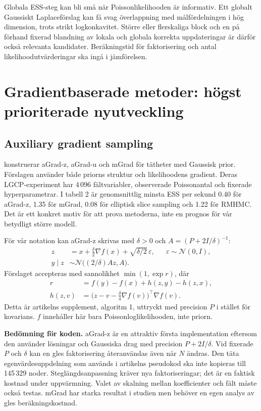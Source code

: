 \documentclass[11pt,a4paper]{article}
\newcommand{\N}{\mathcal N}
\begin{document}
Globala ESS-steg kan bli små när Poissonlikelihooden är informativ. Ett globalt Gaussiskt Laplaceförslag kan få svag överlappning med målfördelningen i hög dimension, trots strikt logkonkavitet. Större eller flerskaliga block och en på förhand fixerad blandning av lokala och globala korrekta uppdateringar är därför också relevanta kandidater. Beräkningstid för faktorisering och antal likelihoodutvärderingar ska ingå i jämförelsen.

\section{Gradientbaserade metoder: högst prioriterade nyutveckling}

\subsection{Auxiliary gradient sampling}

\citet{titsias2018auxiliary} konstruerar aGrad-z, aGrad-u och mGrad för tätheter med Gaussisk prior. Förslagen använder både priorns struktur och likelihoodens gradient. Deras LGCP-experiment har 4\,096 fältvariabler, observerade Poissonantal och fixerade hyperparametrar. I tabell 2 är genomsnittlig minsta ESS per sekund 0.40 för aGrad-z, 1.35 för mGrad, 0.08 för elliptisk slice sampling och 1.22 för RMHMC. Det är ett konkret motiv för att prova metoderna, inte en prognos för vår betydligt större modell.

För vår notation kan aGrad-z skrivas med $\delta>0$ och $A=(P+2I/\delta)^{-1}$:
\begin{align}
 z&=x+\tfrac\delta2\nabla f(x)+\sqrt{\delta/2}\,\varepsilon,
       &&\varepsilon\sim\N(0,I),\\
 y\mid z&\sim\N\bigl((2/\delta)Az,A\bigr).
\end{align}
Förslaget accepteras med sannolikhet $\min(1,\exp r)$, där
\begin{align}
 r&=f(y)-f(x)+h(z,y)-h(z,x),\\
 h(z,v)&=\bigl(z-v-\tfrac\delta4\nabla f(v)\bigr)^\top\nabla f(v).
\end{align}
Detta är artikelns supplement, algoritm 1, uttryckt med precision $P$ i stället för kovarians. $f$ innehåller här bara Poissonloglikelihooden, inte priorn.

\textbf{Bedömning för koden.} aGrad-z är en attraktiv första implementation eftersom den använder lösningar och Gaussiska drag med precision $P+2I/\delta$. Vid fixerade $P$ och $\delta$ kan en gles faktorisering återanvändas även när $N$ ändras. Den täta egenvärdesuppdelning som används i artikelns pseudokod ska inte kopieras till 145\,329 noder. Steglängdsanpassning kräver nya faktoriseringar; det är en faktisk kostnad under uppvärmning. Valet av skalning mellan koefficienter och fält måste också testas. mGrad har starka resultat i studien men behöver en egen analys av gles beräkningskostnad.
\end{document}
